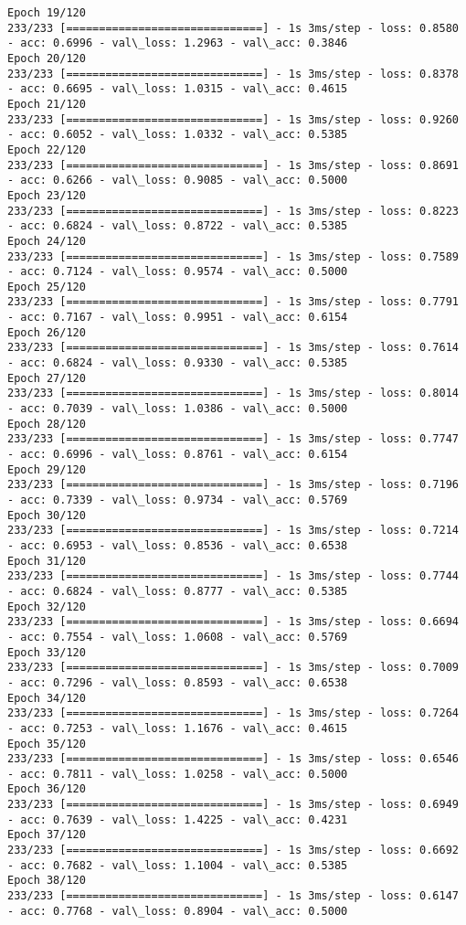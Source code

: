 \documentclass[11pt]{article}
\begin{document}
\begin{Verbatim}[commandchars=\\\{\}]
Epoch 19/120
233/233 [==============================] - 1s 3ms/step - loss: 0.8580 - acc: 0.6996 - val\_loss: 1.2963 - val\_acc: 0.3846
Epoch 20/120
233/233 [==============================] - 1s 3ms/step - loss: 0.8378 - acc: 0.6695 - val\_loss: 1.0315 - val\_acc: 0.4615
Epoch 21/120
233/233 [==============================] - 1s 3ms/step - loss: 0.9260 - acc: 0.6052 - val\_loss: 1.0332 - val\_acc: 0.5385
Epoch 22/120
233/233 [==============================] - 1s 3ms/step - loss: 0.8691 - acc: 0.6266 - val\_loss: 0.9085 - val\_acc: 0.5000
Epoch 23/120
233/233 [==============================] - 1s 3ms/step - loss: 0.8223 - acc: 0.6824 - val\_loss: 0.8722 - val\_acc: 0.5385
Epoch 24/120
233/233 [==============================] - 1s 3ms/step - loss: 0.7589 - acc: 0.7124 - val\_loss: 0.9574 - val\_acc: 0.5000
Epoch 25/120
233/233 [==============================] - 1s 3ms/step - loss: 0.7791 - acc: 0.7167 - val\_loss: 0.9951 - val\_acc: 0.6154
Epoch 26/120
233/233 [==============================] - 1s 3ms/step - loss: 0.7614 - acc: 0.6824 - val\_loss: 0.9330 - val\_acc: 0.5385
Epoch 27/120
233/233 [==============================] - 1s 3ms/step - loss: 0.8014 - acc: 0.7039 - val\_loss: 1.0386 - val\_acc: 0.5000
Epoch 28/120
233/233 [==============================] - 1s 3ms/step - loss: 0.7747 - acc: 0.6996 - val\_loss: 0.8761 - val\_acc: 0.6154
Epoch 29/120
233/233 [==============================] - 1s 3ms/step - loss: 0.7196 - acc: 0.7339 - val\_loss: 0.9734 - val\_acc: 0.5769
Epoch 30/120
233/233 [==============================] - 1s 3ms/step - loss: 0.7214 - acc: 0.6953 - val\_loss: 0.8536 - val\_acc: 0.6538
Epoch 31/120
233/233 [==============================] - 1s 3ms/step - loss: 0.7744 - acc: 0.6824 - val\_loss: 0.8777 - val\_acc: 0.5385
Epoch 32/120
233/233 [==============================] - 1s 3ms/step - loss: 0.6694 - acc: 0.7554 - val\_loss: 1.0608 - val\_acc: 0.5769
Epoch 33/120
233/233 [==============================] - 1s 3ms/step - loss: 0.7009 - acc: 0.7296 - val\_loss: 0.8593 - val\_acc: 0.6538
Epoch 34/120
233/233 [==============================] - 1s 3ms/step - loss: 0.7264 - acc: 0.7253 - val\_loss: 1.1676 - val\_acc: 0.4615
Epoch 35/120
233/233 [==============================] - 1s 3ms/step - loss: 0.6546 - acc: 0.7811 - val\_loss: 1.0258 - val\_acc: 0.5000
Epoch 36/120
233/233 [==============================] - 1s 3ms/step - loss: 0.6949 - acc: 0.7639 - val\_loss: 1.4225 - val\_acc: 0.4231
Epoch 37/120
233/233 [==============================] - 1s 3ms/step - loss: 0.6692 - acc: 0.7682 - val\_loss: 1.1004 - val\_acc: 0.5385
Epoch 38/120
233/233 [==============================] - 1s 3ms/step - loss: 0.6147 - acc: 0.7768 - val\_loss: 0.8904 - val\_acc: 0.5000

\end{Verbatim}
\end{document}
